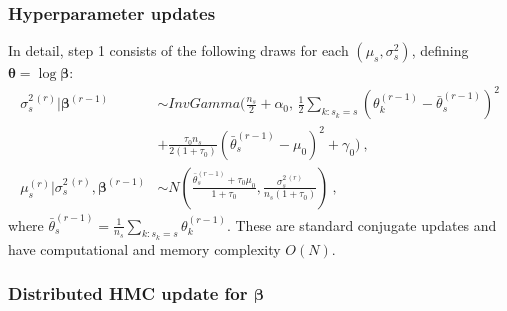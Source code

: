 \subsubsection{Hyperparameter updates}

In detail, step 1 consists of the following draws for each $(\mu_s, \sigma^2_s)$, defining $\bm \theta = \log \bm \beta$:
\begin{align}
 \sigma_s^{2\,(r)} | \bm \beta^{(r-1)} &\sim InvGamma{\bigg(}\frac{n_s}{2} + \alpha_0,
  \, \frac{1}{2} \sum_{k:s_k = s} (\theta_k^{(r-1)} - \bar{\theta}_s^{(r-1)})^2  \\
\nonumber
  & + \frac{\tau_0 n_s}{2 (1 + \tau_0)} (\bar{\theta}_s^{(r-1)} - \mu_0)^2
  + \gamma_0 {\bigg)} \ , \\
 \mu_s^{(r)} | \sigma_s^{2\,(r)}, \bm \beta^{(r-1)} &\sim N\left( \frac{\bar{\theta}_s^{(r-1)} + \tau_0 \mu_0}{1 + \tau_0}, \frac{\sigma_s^{2\,(r)}}{n_s (1 + \tau_0)} \right) \ ,
\end{align}
where $\bar{\theta}_s^{(r-1)} = \frac{1}{n_s} \sum_{k : s_k = s} \theta_k^{(r-1)}$.
These are standard conjugate updates and have computational and memory complexity $O(N)$.

\subsubsection{Distributed HMC update for \texorpdfstring{$\bm \beta$}{beta}}
\label{sec:distributedHMC}


